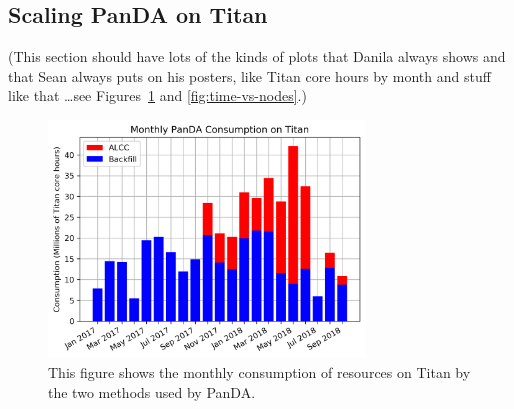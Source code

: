 \subsection{Scaling PanDA on Titan}
\label{subsec:scaling}

(This section should have lots of the kinds of plots that Danila always shows
and that Sean always puts on his posters, like Titan core hours by month and
stuff like that \ldots see Figures~\ref{fig:monthly-consumption} and
\ref{fig:time-vs-nodes}.)

\begin{figure}
  \includegraphics[width=0.75\textwidth]{images/monthly-consumption.png}
\caption{This figure shows the monthly consumption of resources on Titan by the
two methods used by PanDA.}
\label{fig:monthly-consumption}
\end{figure}



